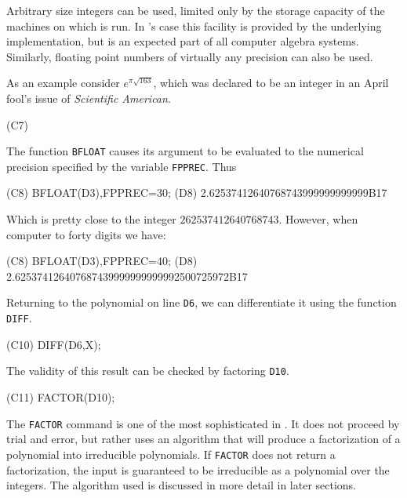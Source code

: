 Arbitrary size integers can be used, limited only by the storage
capacity of the machines on which {\Macsyma} is run.  In {\Macsyma}'s case this
facility is provided by the underlying {\Lisp} implementation, but is an
expected part of all computer algebra systems.  Similarly, floating
point numbers of virtually any precision can also be used.

As an example consider $e^{\pi \sqrt{163}}$, which was declared to be an
integer in an April fool's issue of {\em Scientific
American\/}.

\begin{code}
(C7) %
\end{code}
The {\Macsyma} function {\tt BFLOAT} causes its argument to be evaluated
to the numerical precision specified by the variable {\tt FPPREC}.  Thus
\begin{code}
(C8) BFLOAT(D3),FPPREC=30;
(D8)       2.62537412640768743999999999999B17
\end{code}
Which is pretty close to the integer $262537412640768743$.  However, when
computer to forty digits we have:
\begin{code}
(C8) BFLOAT(D3),FPPREC=40;
(D8)  2.625374126407687439999999999992500725972B17
\end{code}

Returning to the polynomial on line {\tt D6}, we can differentiate it using
the function {\tt DIFF}.
\begin{code}
(C10) DIFF(D6,X);
\end{code}

\noindent
The validity of this result can be checked by factoring {\tt D10}.
\begin{code}
(C11) FACTOR(D10);
\end{code}
The {\tt FACTOR} command is one of the most sophisticated in
{\Macsyma}.  It does not proceed by trial and error, but rather uses an algorithm
that will produce a factorization of a polynomial into irreducible
polynomials.  If {\tt FACTOR} does not return a factorization, the input
is guaranteed to be irreducible as a polynomial over the integers.  The
algorithm used is discussed in more detail in later sections.

